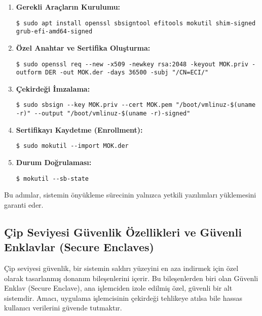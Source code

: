 \begin{enumerate}
    \item \textbf{Gerekli Araçların Kurulumu:}
    \begin{lstlisting}[breaklines=true,basicstyle=\ttfamily\footnotesize]
$ sudo apt install openssl sbsigntool efitools mokutil shim-signed grub-efi-amd64-signed
    \end{lstlisting}

    \item \textbf{Özel Anahtar ve Sertifika Oluşturma:}
    \begin{lstlisting}[breaklines=true,basicstyle=\ttfamily\footnotesize]
$ sudo openssl req --new -x509 -newkey rsa:2048 -keyout MOK.priv -outform DER -out MOK.der -days 36500 -subj "/CN=ECI/"
    \end{lstlisting}

    \item \textbf{Çekirdeği İmzalama:}
    \begin{lstlisting}[breaklines=true,basicstyle=\ttfamily\footnotesize]
$ sudo sbsign --key MOK.priv --cert MOK.pem "/boot/vmlinuz-$(uname -r)" --output "/boot/vmlinuz-$(uname -r)-signed"
    \end{lstlisting}

    \item \textbf{Sertifikayı Kaydetme (Enrollment):}
    \begin{lstlisting}[breaklines=true,basicstyle=\ttfamily\footnotesize]
$ sudo mokutil --import MOK.der
    \end{lstlisting}

    \item \textbf{Durum Doğrulaması:}
    \begin{lstlisting}[breaklines=true,basicstyle=\ttfamily\footnotesize]
$ mokutil --sb-state
    \end{lstlisting}
\end{enumerate}
Bu adımlar, sistemin önyükleme sürecinin yalnızca yetkili yazılımları yüklemesini garanti eder.

\subsection{Çip Seviyesi Güvenlik Özellikleri ve Güvenli Enklavlar (Secure Enclaves)}

Çip seviyesi güvenlik, bir sistemin saldırı yüzeyini en aza indirmek için özel olarak tasarlanmış donanım bileşenlerini içerir. Bu bileşenlerden biri olan Güvenli Enklav (Secure Enclave), ana işlemciden izole edilmiş özel, güvenli bir alt sistemdir. Amacı, uygulama işlemcisinin çekirdeği tehlikeye atılsa bile hassas kullanıcı verilerini güvende tutmaktır.

